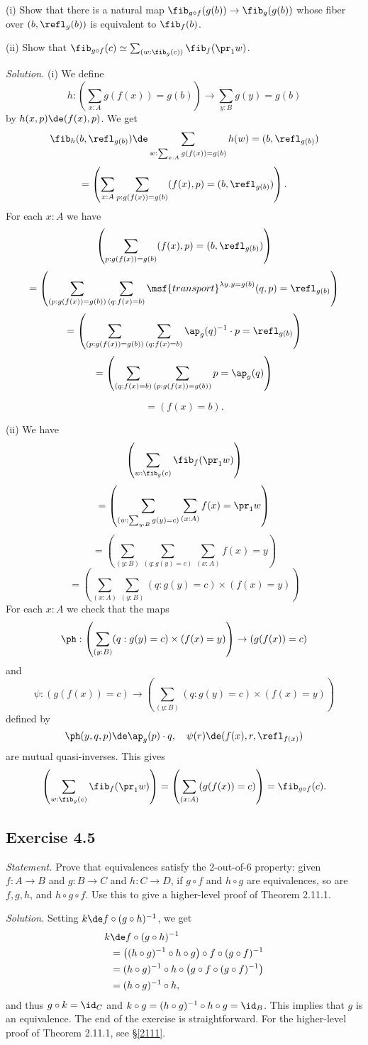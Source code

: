 \documentclass[12pt]{article}
\begin{document}
\nn(i) Show that there is a natural map $\fib_{g\circ f}(g(b))\to\fib_g(g(b))$ whose fiber over $(b, \refl_g(b) )$ is equivalent to $\fib_f(b)$.

\nn(ii) Show that $\fib_{g\circ f}(c)\simeq\sum_{(w:\fib_g(c))}\fib_f(\pr_1w)$.

\nn\emph{Solution.} (i) We define 
$$
h:\left(\sum_{x:A}g(f(x))=g(b)\right)\to\sum_{y:B}g(y)=g(b)
$$ 
by $h(x,p)\de(f(x),p)$. We get 
$$
\fib_h(b,\refl_{g(b)})\de\sum_{w:\sum_{x:A}g(f(x))=g(b)}h(w)=(b,\refl_{g(b)})
$$ 
$$
=\left(\sum_{x:A}\sum_{p:g(f(x))=g(b)}(f(x),p)=(b,\refl_{g(b)})\right).
$$ 
For each $x:A$ we have
$$
\left(\sum_{p:g(f(x))=g(b)}(f(x),p)=(b,\refl_{g(b)})\right)
$$ 
$$
=\left(\sum_{(p:g(f(x))=g(b))}\sum_{(q:f(x)=b)}\msf{transport}^{\lambda y.y=g(b)}(q,p)=\refl_{g(b)}\right)
$$ 
$$
=\left(\sum_{(p:g(f(x))=g(b))}\sum_{(q:f(x)=b)}\ap_g(q)^{-1}\cdot p=\refl_{g(b)}\right)
$$ 
$$
=\left(\sum_{(q:f(x)=b)}\sum_{(p:g(f(x))=g(b))}p=\ap_g(q)\right)
$$ 

$$
=(f(x)=b).
$$ 

\nn(ii) We have 
$$
\left(\sum_{w:\fib_g(c)}\fib_f(\pr_1w)\right)
$$ 
$$
=\left(\sum_{(w:\sum_{y:B}g(y)=c)}\sum_{(x:A)}f(x)=\pr_1w\right)
$$ 
$$
=\left(\sum_{(y:B)}\sum_{(q:g(y)=c)}\sum_{(x:A)}f(x)=y\right)
$$ 
$$
=\left(\sum_{(x:A)}\sum_{(y:B)}(q:g(y)=c)\times(f(x)=y)\right)
$$ 
For each $x:A$ we check that the maps 
$$
\ph:\left(\sum_{(y:B)}(q:g(y)=c)\times(f(x)=y)\right)\to(g(f(x))=c)
$$ 
and 
$$
\psi:(g(f(x))=c)\to\left(\sum_{(y:B)}(q:g(y)=c)\times(f(x)=y)\right)
$$ 
defined by 
$$
\ph(y,q,p)\de\ap_g(p)\cdot q,\quad\psi(r)\de(f(x),r,\refl_{f(x)})
$$ 
are mutual quasi-inverses. This gives 
$$
\left(\sum_{w:\fib_g(c)}\fib_f(\pr_1w)\right)=\left(\sum_{(x:A)}(g(f(x))=c)\right)=\fib_{g\circ f}(c).
$$


\subsection{Exercise 4.5}\label{45}

\emph{Statement.} Prove that equivalences satisfy the 2-out-of-6 property: given $f:A\to B$ and $g:B\to C$ and $h:C\to D$, if $g\circ f$ and $h\circ g$ are equivalences, so are $f,g,h$, and $h\circ g\circ f$. Use this to give a higher-level proof of Theorem 2.11.1.

\nn\emph{Solution.} Setting $k\de f\circ (g\circ h)^{-1}$, we get 
\begin{align*}
k&\de f\circ (g\circ h)^{-1}\\
&=\big((h\circ g)^{-1}\circ h\circ g\big)\circ f\circ (g\circ f)^{-1}\\
&=(h\circ g)^{-1}\circ h\circ\big(g\circ f\circ (g\circ f)^{-1}\big)\\
&=(h\circ g)^{-1}\circ h,
\end{align*}
and thus $g\circ k=\id_C$ and $k\circ g=(h\circ g)^{-1}\circ h\circ g=\id_B$. This implies that $g$ is an equivalence. The end of the exercise is straightforward. For the higher-level proof of Theorem 2.11.1, see \S\ref{2111}.
\end{document}
